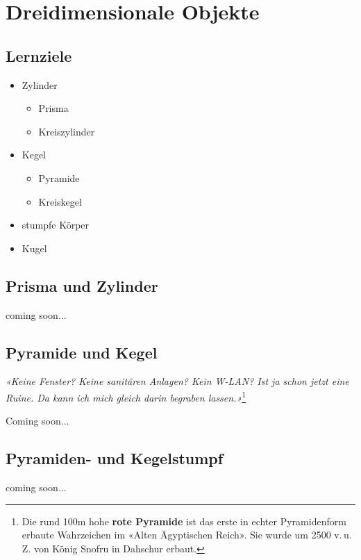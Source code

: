 \section{Dreidimensionale Objekte}


\subsection*{Lernziele}
\begin{itemize}
\item Zylinder
  \begin{itemize}
  \item Prisma
  \item Kreiszylinder
    \end{itemize}
\item Kegel
  \begin{itemize}
  \item Pyramide
  \item Kreiskegel
  \end{itemize}
  \item stumpfe Körper
  \item Kugel
\end{itemize}
\newpage

\subsection{Prisma und Zylinder}
coming soon...


\subsection{Pyramide und Kegel}

\begin{center}
{\textit{«Keine Fenster? Keine sanitären Anlagen? Kein W-LAN? Ist ja schon
jetzt eine Ruine. Da kann ich mich gleich darin begraben
lassen.»}}\footnote{Die rund 100m hohe \textbf{rote Pyramide} ist das
  erste in echter Pyramidenform erbaute Wahrzeichen im «Alten
  Ägyptischen Reich». Sie wurde um 2500 v.\,u.\,Z. von König Snofru in
Dahschur erbaut.}
\end{center}



Coming soon...
\newpage

\subsection{Pyramiden- und Kegelstumpf}
coming soon...
\newpage
